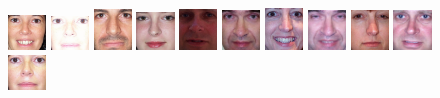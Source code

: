 \begin{figure}[H]
\includegraphics[width=0.09\textwidth]{img/fdResult1/output65.png}
\includegraphics[width=0.09\textwidth]{img/fdResult1/output66.png}
\includegraphics[width=0.09\textwidth]{img/fdResult1/output68.png}
\includegraphics[width=0.09\textwidth]{img/fdResult1/output70.png}
\includegraphics[width=0.09\textwidth]{img/fdResult1/output71.png}
\includegraphics[width=0.09\textwidth]{img/fdResult1/output75.png}
\includegraphics[width=0.09\textwidth]{img/fdResult1/output76.png}
\includegraphics[width=0.09\textwidth]{img/fdResult1/output77.png}
\includegraphics[width=0.09\textwidth]{img/fdResult1/output80.png}
\includegraphics[width=0.09\textwidth]{img/fdResult1/output82.png}
\includegraphics[width=0.09\textwidth]{img/fdResult1/output83.png}

\end{figure}
